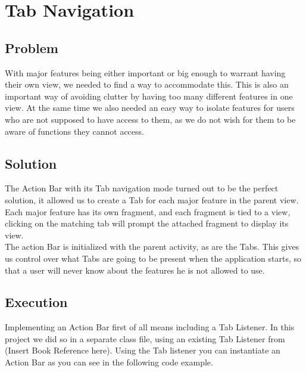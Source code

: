 \section{Tab Navigation} %
\subsection{Problem}
With major features being either important or big enough to warrant having their own view, we needed to find a way to accommodate this.
This is also an important way of avoiding clutter by having too many different features in one view.
At the same time we also needed an easy way to isolate features for users who are not supposed to have access to them, as we do not wish for them to be aware of functions they cannot access.

\subsection{Solution}
The Action Bar with its Tab navigation mode turned out to be the perfect solution, it allowed us to create a Tab for each major feature in the parent view.
Each major feature has its own fragment, and each fragment is tied to a view, clicking on the matching tab will prompt the attached fragment to display its view.\\
The action Bar is initialized with the parent activity, as are the Tabs.
This gives us control over what Tabs are going to be present when the application starts, so that a user will never know about the features he is not allowed to use.

\subsection{Execution}
Implementing an Action Bar first of all means including a Tab Listener.
In this project we did so in a separate class file, using an existing Tab Listener from (Insert Book Reference here).
Using the Tab listener you can instantiate an Action Bar as you can see in the following code example.

